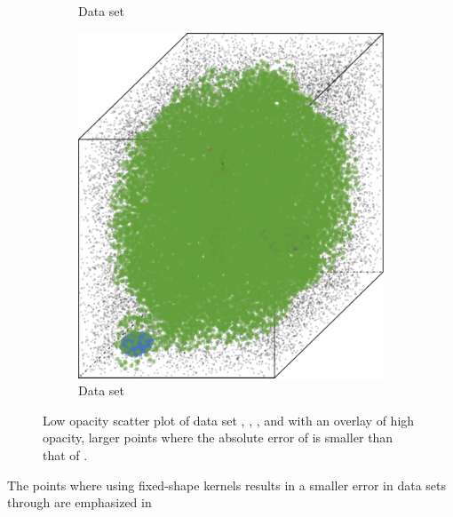 \begin{figure}
\begin{subfigure}{0.23\textwidth}
				\caption{Data set \ferdosiThree}
				\label{fig:discussion:performance:mbeLowerError:ferdosi3}
			\end{subfigure}
			\begin{subfigure}{0.23\textwidth}
				\centering
				\includegraphics[keepaspectratio=true, width=\textwidth, height=0.23\textheight]{discussion/img/baakman_3_abs_error_mbeSmallerThansambe}
				\caption{Data set \baakmanThree}
				\label{fig:discussion:performance:mbeLowerError:baakman3}
			\end{subfigure}
			\caption{Low opacity scatter plot of data set %
				 \ferdosiTwo, %
				 \baakmanTwo, %
				 \ferdosiThree, and %
				 \baakmanThree %
				with an overlay of high opacity, larger points where the absolute error of \mbe is smaller than that of \sambe.}
			\label{fig:discussion:performance:multisphere:mbeLowerError}
		\end{figure}
		The points where using fixed-shape kernels results in a smaller error in data sets \ferdosiTwo through \baakmanThree are emphasized in
